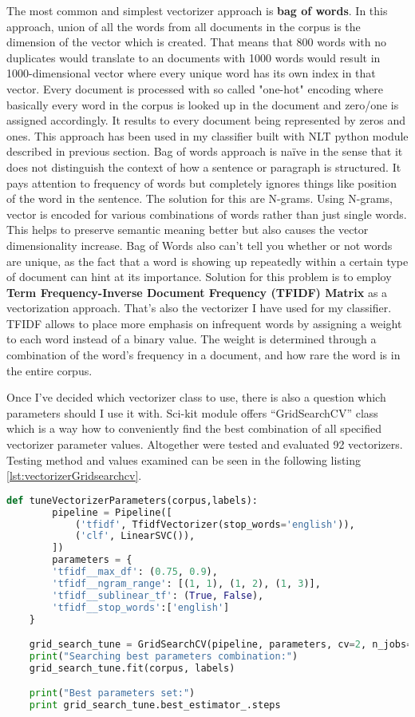 The most common and simplest vectorizer approach is \textbf{bag of words}.	In this approach, union of all the words from all documents in the corpus is the dimension of the vector which is created. That means that 800 words with no duplicates would translate to an documents with 1000 words would result in 1000-dimensional vector where every unique word has its own index in that vector. Every document is processed with so called "one-hot" encoding where basically every word in the corpus is looked up in the document and zero/one is assigned accordingly. It results to every document being represented by zeros and ones. This approach has been used in my classifier built with NLT python module described in previous section. Bag of words approach is naïve in the sense that it does not distinguish the context of how a sentence or paragraph is structured. It pays attention to frequency of words but completely ignores things like position of the word in the sentence. The solution for this are N-grams. Using N-grams, vector is encoded for various combinations of words rather than just single words. This helps to preserve semantic meaning better but also causes the vector dimensionality increase. Bag of Words also can’t tell you whether or not words are unique, as the fact that a word is showing up repeatedly within a certain type of document can hint at its importance. Solution for this problem is to employ \textbf{Term Frequency-Inverse Document Frequency (TFIDF) Matrix} as a vectorization approach. That's also the vectorizer I have used for my classifier. TFIDF allows to place more emphasis on infrequent words by assigning a weight to each word instead of a binary value. The weight is determined through a combination of the word’s frequency in a document, and how rare the word is in the entire corpus.

Once I've decided which vectorizer class to use, there is also a question which parameters should I use it with. Sci-kit module offers “GridSearchCV” class which is a way how to conveniently find the best combination of all specified vectorizer parameter values. Altogether were tested and evaluated 92 vectorizers. Testing method and values examined can be seen in the following listing \ref{lst:vectorizerGridsearchcv}. 

\begin{lstlisting}[caption={Tuning of vectorizer using “GridSearchCV” class },label={lst:vectorizerGridsearchcv},language=Python]
    def tuneVectorizerParameters(corpus,labels):
    	pipeline = Pipeline([
        	('tfidf', TfidfVectorizer(stop_words='english')),
        	('clf', LinearSVC()),
    	])
    	parameters = {
        'tfidf__max_df': (0.75, 0.9),
        'tfidf__ngram_range': [(1, 1), (1, 2), (1, 3)],
        'tfidf__sublinear_tf': (True, False),
        'tfidf__stop_words':['english']
    }

    grid_search_tune = GridSearchCV(pipeline, parameters, cv=2, n_jobs=2, verbose=3)
    print("Searching best parameters combination:")
    grid_search_tune.fit(corpus, labels)

    print("Best parameters set:")
    print grid_search_tune.best_estimator_.steps
\end{lstlisting}

